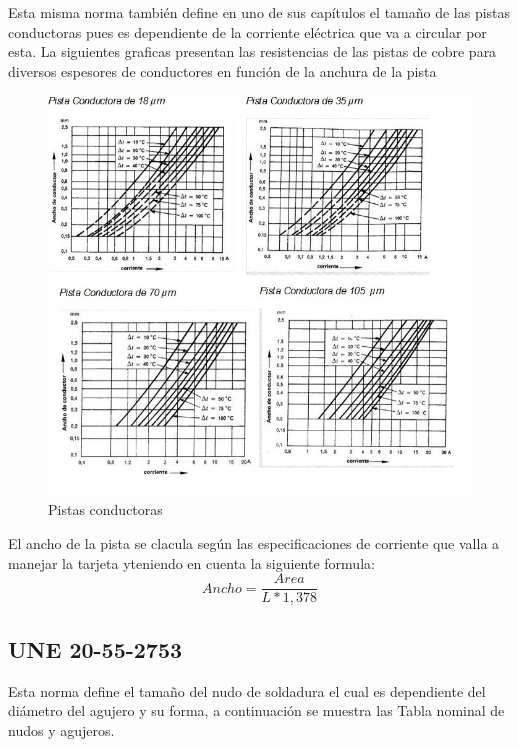 \documentclass[a4paper,12pt,twoside]{proyectotanquesecci}
\begin{document}
Esta misma norma  también define en uno de sus capítulos  el tamaño de las pistas conductoras pues es dependiente  de la corriente eléctrica que va a circular por esta. 
La siguientes graficas presentan las resistencias de las pistas de cobre para diversos espesores de conductores  en función de la anchura de la pista

\begin{figure}[h]
\centering
\includegraphics[scale=0.8]{pistas.jpg}
\renewcommand{\figurename}{Fig.}
\caption{Pistas conductoras}
\label{Pistas conductoras}
\end{figure}

El ancho de la pista se clacula según las especificaciones de corriente que valla a manejar la tarjeta yteniendo en cuenta la siguiente formula:
\begin{equation}
Ancho=\frac{Area}{L*1,378}
\label{Ecu 2}
\end{equation}

\subsection{UNE 20-55-2753}
Esta norma define el tamaño del nudo de soldadura el cual es dependiente del  diámetro del agujero  y su forma, a continuación se muestra las Tabla nominal de nudos y agujeros.
\end{document}
